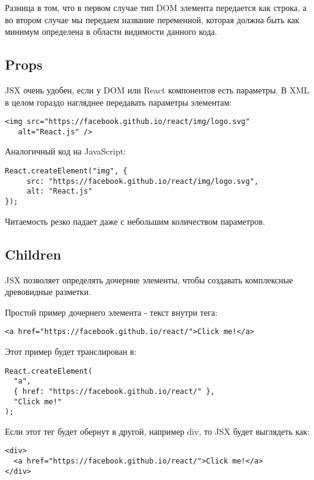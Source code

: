 \documentclass[12pt]{book}
\begin{document}
Разница в том, что в первом случае тип DOM элемента передается как строка, а во втором случае мы передаем название переменной, которая должна быть как минимум определена в области видимости данного кода.

\subsection*{Props}

JSX очень удобен, если у DOM или React компонентов есть параметры. В XML в целом гораздо нагляднее передавать параметры элементам:
   
\begin{lstlisting}
<img src="https://facebook.github.io/react/img/logo.svg"
   alt="React.js" />
\end{lstlisting}

Аналогичный код на JavaScript:

\begin{lstlisting}
React.createElement("img", {
     src: "https://facebook.github.io/react/img/logo.svg",
     alt: "React.js"
});
\end{lstlisting}

Читаемость резко падает даже с небольшим количеством параметров.

\subsection*{Children}

JSX позволяет определять дочерние элементы, чтобы создавать комплексные древовидные разметки.

Простой пример дочернего элемента - текст внутри тега:

\begin{lstlisting}
<a href="https://facebook.github.io/react/">Click me!</a>
\end{lstlisting}

Этот пример будет транслирован в:

\begin{lstlisting}
React.createElement(
  "a",
  { href: "https://facebook.github.io/react/" },
  "Click me!"
);
\end{lstlisting}
   
Если этот тег будет обернут в другой, например div, то JSX будет выглядеть как:

\begin{lstlisting}
<div>
  <a href="https://facebook.github.io/react/">Click me!</a>
</div>
\end{lstlisting}
\end{document}
